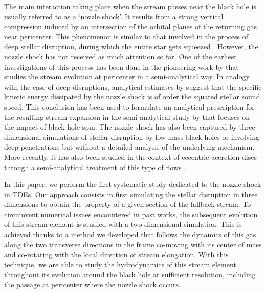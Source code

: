 \documentclass[a4paper,fleqn,usenatbib]{mnras}
\begin{document}
The main interaction taking place when the stream passes near the black hole is usually referred to as a `nozzle shock'. It results from a strong vertical compression induced by an intersection of the orbital planes of the returning gas near pericenter. This phenomenon is similar to that involved in the process of deep stellar disruption, during which the entire star gets squeezed \citep{carter1982,luminet1985,brassart2008,stone2013}. However, the nozzle shock has not received as much attention so far. One of the earliest investigations of this process has been done in the pioneering work by \citet{kochanek1994} that studies the stream evolution at pericenter in a semi-analytical way. In analogy with the case of deep disruptions, analytical estimates by \cite{guillochon2014-10jh} suggest that the specific kinetic energy dissipated by the nozzle shock is of order the squared stellar sound speed. This conclusion has been used to formulate an analytical prescription for the resulting stream expansion in the semi-analytical study by \citet{guillochon2015} that focuses on the impact of black hole spin. The nozzle shock has also been captured by three-dimensional simulations of stellar disruption by low-mass black holes \citep{ramirez-ruiz2009,shiokawa2015} or involving deep penetrations \citep{sadowski2016} but without a detailed analysis of the underlying mechanism. More recently, it has also been studied in the context of eccentric accretion discs through a semi-analytical treatment of this type of flows \citep{zanazzi2020,lynch2021,lynch2021_magnetic}.



In this paper, we perform the first systematic study dedicated to the nozzle shock in TDEs. Our approach consists in first simulating the stellar disruption in three dimensions to obtain the property of a given section of the fallback stream. To circumvent numerical issues encountered in past works, the subsequent evolution of this stream element is studied with a two-dimensional simulation. This is achieved thanks to a method we developed that follows the dynamics of this gas along the two transverse directions in the frame co-moving with its center of mass and co-rotating with the local direction of stream elongation. With this technique, we are able to study the hydrodynamics of this stream element throughout its evolution around the black hole at sufficient resolution, including the passage at pericenter where the nozzle shock occurs.
\end{document}
